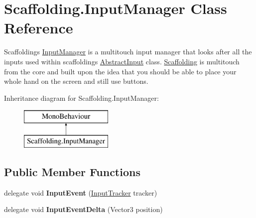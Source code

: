 \hypertarget{class_scaffolding_1_1_input_manager}{\section{Scaffolding.\-Input\-Manager Class Reference}
\label{class_scaffolding_1_1_input_manager}
}


Scaffoldings \hyperlink{class_scaffolding_1_1_input_manager}{Input\-Manager} is a multitouch input manager that looks after all the inputs used within scaffoldings \hyperlink{class_scaffolding_1_1_abstract_input}{Abstract\-Input} class. \hyperlink{namespace_scaffolding}{Scaffolding} is multitouch from the core and built upon the idea that you should be able to place your whole hand on the screen and still use buttons.  


Inheritance diagram for Scaffolding.\-Input\-Manager\-:\begin{figure}[H]
\begin{center}
\leavevmode
\includegraphics[height=2.000000cm]{class_scaffolding_1_1_input_manager}
\end{center}
\end{figure}
\subsection*{Public Member Functions}
\begin{DoxyCompactItemize}
\item 
\hypertarget{class_scaffolding_1_1_input_manager_ae7622b2ff061b41fef5b7949cef8804b}{delegate void {\bfseries Input\-Event} (\hyperlink{class_scaffolding_1_1_input_tracker}{Input\-Tracker} tracker)}\label{class_scaffolding_1_1_input_manager_ae7622b2ff061b41fef5b7949cef8804b}

\item 
\hypertarget{class_scaffolding_1_1_input_manager_a5f228d24dde2dfd00bf06d20631d2467}{delegate void {\bfseries Input\-Event\-Delta} (Vector3 position)}\label{class_scaffolding_1_1_input_manager_a5f228d24dde2dfd00bf06d20631d2467}

\end{DoxyCompactItemize}
